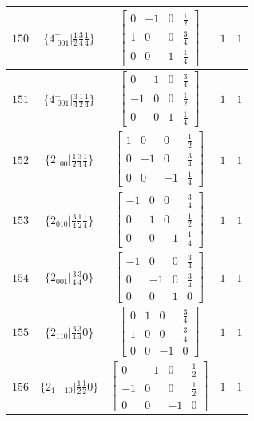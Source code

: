 \documentclass[fleqn,8pt]{jsarticle}
\begin{document}
\begin{longtable}{ccccc}
$ 150 $ & $ \{4^{+}_{\,\,001}|\frac{1}{2} \frac{3}{4} \frac{1}{4}\} $ & $ \begin{bmatrix} 0 & -1 & 0 & \frac{1}{2} \\ 1 & 0 & 0 & \frac{3}{4} \\ 0 & 0 & 1 & \frac{1}{4} \end{bmatrix} $ & $ 1 $ & $ 1 $ \\ \hline
$ 151 $ & $ \{4^{-}_{\,\,001}|\frac{3}{4} \frac{1}{2} \frac{1}{4}\} $ & $ \begin{bmatrix} 0 & 1 & 0 & \frac{3}{4} \\ -1 & 0 & 0 & \frac{1}{2} \\ 0 & 0 & 1 & \frac{1}{4} \end{bmatrix} $ & $ 1 $ & $ 1 $ \\ \hline
$ 152 $ & $ \{2{}_{100}|\frac{1}{2} \frac{3}{4} \frac{1}{4}\} $ & $ \begin{bmatrix} 1 & 0 & 0 & \frac{1}{2} \\ 0 & -1 & 0 & \frac{3}{4} \\ 0 & 0 & -1 & \frac{1}{4} \end{bmatrix} $ & $ 1 $ & $ 1 $ \\ \hline
$ 153 $ & $ \{2{}_{010}|\frac{3}{4} \frac{1}{2} \frac{1}{4}\} $ & $ \begin{bmatrix} -1 & 0 & 0 & \frac{3}{4} \\ 0 & 1 & 0 & \frac{1}{2} \\ 0 & 0 & -1 & \frac{1}{4} \end{bmatrix} $ & $ 1 $ & $ 1 $ \\ \hline
$ 154 $ & $ \{2{}_{001}|\frac{3}{4} \frac{3}{4} 0\} $ & $ \begin{bmatrix} -1 & 0 & 0 & \frac{3}{4} \\ 0 & -1 & 0 & \frac{3}{4} \\ 0 & 0 & 1 & 0 \end{bmatrix} $ & $ 1 $ & $ 1 $ \\ \hline
$ 155 $ & $ \{2{}_{110}|\frac{3}{4} \frac{3}{4} 0\} $ & $ \begin{bmatrix} 0 & 1 & 0 & \frac{3}{4} \\ 1 & 0 & 0 & \frac{3}{4} \\ 0 & 0 & -1 & 0 \end{bmatrix} $ & $ 1 $ & $ 1 $ \\ \hline
$ 156 $ & $ \{2{}_{1-10}|\frac{1}{2} \frac{1}{2} 0\} $ & $ \begin{bmatrix} 0 & -1 & 0 & \frac{1}{2} \\ -1 & 0 & 0 & \frac{1}{2} \\ 0 & 0 & -1 & 0 \end{bmatrix} $ & $ 1 $ & $ 1 $ \\ \hline

\end{longtable}
\end{document}
